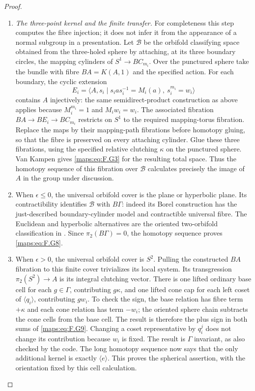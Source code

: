 \documentclass[11pt,a4paper]{article}
\theoremstyle{definition}
\begin{document}
\begin{proof}
\begin{enumerate}[label=\arabic*.]
\item \emph{The three-point kernel and the finite transfer.}
For completeness this step computes the fibre injection; it
does not infer it from the appearance of a normal subgroup in
a presentation.  Let $\mathcal B$ be the orbifold classifying
space obtained from the three-holed sphere by attaching, at
its three boundary circles, the mapping cylinders of
$S^1\to BC_{m_i}$.  Over the punctured sphere take the bundle
with fibre $BA=K(A,1)$ and the specified action.  For each
boundary, the cyclic extension
\[
 E_i=\langle A,s_i\mid s_i a s_i^{-1}=M_i(a),\ s_i^{m_i}=w_i\rangle
\]
contains $A$ injectively: the same semidirect-product construction
as above applies because $M_i^{m_i}=1$ and $M_iw_i=w_i$.
The associated fibration $BA\to BE_i\to BC_{m_i}$ restricts
on $S^1$ to the required mapping-torus fibration.  Replace the
maps by their mapping-path fibrations before homotopy gluing,
so that the fibre is preserved on every attaching cylinder.
Glue these three fibrations, using the specified relative clutching
$\kappa$ on the punctured sphere.  Van Kampen gives \eqref{maps:eq:F.G3}
for the resulting total space.  Thus the homotopy sequence
of this fibration over $\mathcal B$ calculates precisely
the image of $A$ in the group under discussion.

\item When $\epsilon\le0$, the universal orbifold cover is the plane
or hyperbolic plane.  Its contractibility identifies
$\mathcal B$ with $B\Gamma$: indeed its Borel construction
has the just-described boundary-cylinder model and contractible
universal fibre.  The Euclidean and hyperbolic alternatives
are the oriented two-orbifold classification in
\cite[Theorems 2.3--2.4, p.~425; Euler-characteristic comparison, pp.~427--428]{rootScott83}.
Since $\pi_2(B\Gamma)=0$, the homotopy sequence proves \eqref{maps:eq:F.G8}.

\item When $\epsilon>0$, the universal orbifold cover is $S^2$.
Pulling the constructed $BA$ fibration to this finite cover
trivializes its local system.  Its transgression
$\pi_2(S^2)\to A$ is its integral clutching vector.
There is one lifted ordinary base cell for each $g\in\Gamma$,
contributing $g\kappa$, and one lifted cone cap for each left
coset of $\langle q_i\rangle$, contributing $gw_i$.
To check the sign, the base relation has fibre term $+\kappa$
and each cone relation has term $-w_i$; the oriented sphere
chain subtracts the cone cells from the base cell.  The result
is therefore the plus sign in both sums of \eqref{maps:eq:F.G9}.
Changing a coset representative by $q_i^j$ does not change
its contribution because $w_i$ is fixed.  The result is
$\Gamma$ invariant, as also checked by the code.  The long
homotopy sequence now says that the only additional kernel
is exactly $\langle e\rangle$.  This proves the spherical
assertion, with the orientation fixed by this cell calculation.


\end{enumerate}
\end{proof}
\end{document}
